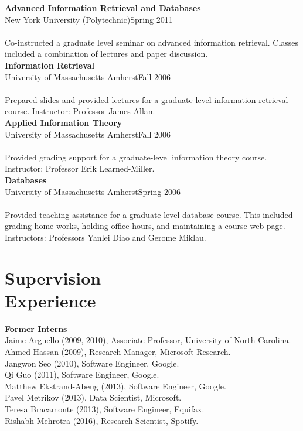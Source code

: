\documentclass{article}
\begin{document}
\noindent\textbf{Advanced Information Retrieval and Databases} \\
New York University (Polytechnic)\hfill Spring 2011\\\\
Co-instructed a graduate level seminar on advanced information retrieval.  Classes included a combination of lectures and paper discussion. \\

\noindent\textbf{Information Retrieval} \\
University of Massachusetts Amherst\hfill Fall 2006\\\\
Prepared slides and provided lectures for a graduate-level information retrieval course. Instructor: Professor James Allan.\\

\noindent\textbf{Applied Information Theory} \\
University of Massachusetts Amherst\hfill Fall 2006\\\\
Provided grading support for a graduate-level information theory course. Instructor: Professor Erik Learned-Miller.\\

\noindent\textbf{Databases} \\
University of Massachusetts Amherst\hfill Spring 2006\\\\
Provided teaching assistance for a graduate-level database course. This included grading home works, holding office hours, and maintaining a course web page. Instructors: Professors Yanlei Diao and Gerome Miklau.

\section{Supervision\\Experience}\noindent\textbf{Former Interns}\\
Jaime Arguello (2009, 2010), Associate Professor, University of North Carolina.\\
Ahmed Hassan (2009), Research Manager, Microsoft Research.\\
Jangwon Seo (2010), Software Engineer, Google.\\
Qi Guo (2011), Software Engineer, Google.\\
Matthew Ekstrand-Abeug (2013), Software Engineer, Google.\\
Pavel Metrikov (2013), Data Scientist, Microsoft.\\
Teresa Bracamonte (2013), Software Engineer, Equifax.\\
Rishabh Mehrotra (2016),  Research Scientist, Spotify.\\
\end{document}

